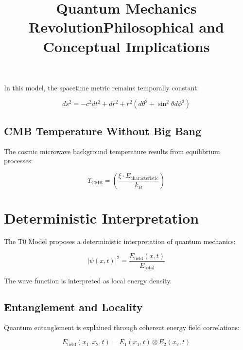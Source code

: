 \documentclass[12pt,a4paper]{report}
\begin{document}
	In this model, the spacetime metric remains temporally constant:
	
	\begin{equation}
		ds^2 = -c^2 dt^2 + dr^2 + r^2(d\theta^2 + \sin^2\theta d\phi^2)
	\end{equation}
	
	\subsection{CMB Temperature Without Big Bang}
	
	The cosmic microwave background temperature results from equilibrium processes:
	
	\begin{equation}
		T_{\text{CMB}} = \left(\frac{\xi \cdot E_{\text{characteristic}}}{k_B}\right)
	\end{equation}
	
	\title{Quantum Mechanics Revolution}
\maketitle
	
	\section{Deterministic Interpretation}
	
	The T0 Model proposes a deterministic interpretation of quantum mechanics:
	
	\begin{equation}
		|\psi(x,t)|^2 = \frac{E_{\text{field}}(x,t)}{E_{\text{total}}}
	\end{equation}
	
	The wave function is interpreted as local energy density.
	
	\subsection{Entanglement and Locality}
	
	Quantum entanglement is explained through coherent energy field correlations:
	
	\begin{equation}
		E_{\text{field}}(x_1, x_2, t) = E_1(x_1,t) \otimes E_2(x_2,t)
	\end{equation}
	
	\title{Philosophical and Conceptual Implications}
\maketitle
	
\end{document}
